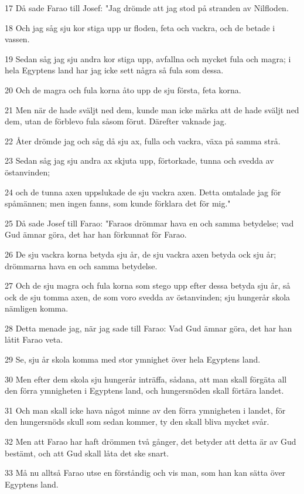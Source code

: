 \par 17 Då sade Farao till Josef: "Jag drömde att jag stod på stranden av Nilfloden.
\par 18 Och jag såg sju kor stiga upp ur floden, feta och vackra, och de betade i vassen.
\par 19 Sedan såg jag sju andra kor stiga upp, avfallna och mycket fula och magra; i hela Egyptens land har jag icke sett några så fula som dessa.
\par 20 Och de magra och fula korna åto upp de sju första, feta korna.
\par 21 Men när de hade sväljt ned dem, kunde man icke märka att de hade sväljt ned dem, utan de förblevo fula såsom förut. Därefter vaknade jag.
\par 22 Åter drömde jag och såg då sju ax, fulla och vackra, växa på samma strå.
\par 23 Sedan såg jag sju andra ax skjuta upp, förtorkade, tunna och svedda av östanvinden;
\par 24 och de tunna axen uppslukade de sju vackra axen. Detta omtalade jag för spåmännen; men ingen fanns, som kunde förklara det för mig."
\par 25 Då sade Josef till Farao: "Faraos drömmar hava en och samma betydelse; vad Gud ämnar göra, det har han förkunnat för Farao.
\par 26 De sju vackra korna betyda sju år, de sju vackra axen betyda ock sju år; drömmarna hava en och samma betydelse.
\par 27 Och de sju magra och fula korna som stego upp efter dessa betyda sju år, så ock de sju tomma axen, de som voro svedda av östanvinden; sju hungerår skola nämligen komma.
\par 28 Detta menade jag, när jag sade till Farao: Vad Gud ämnar göra, det har han låtit Farao veta.
\par 29 Se, sju år skola komma med stor ymnighet över hela Egyptens land.
\par 30 Men efter dem skola sju hungerår inträffa, sådana, att man skall förgäta all den förra ymnigheten i Egyptens land, och hungersnöden skall förtära landet.
\par 31 Och man skall icke hava något minne av den förra ymnigheten i landet, för den hungersnöds skull som sedan kommer, ty den skall bliva mycket svår.
\par 32 Men att Farao har haft drömmen två gånger, det betyder att detta är av Gud bestämt, och att Gud skall låta det ske snart.
\par 33 Må nu alltså Farao utse en förståndig och vis man, som han kan sätta över Egyptens land.
